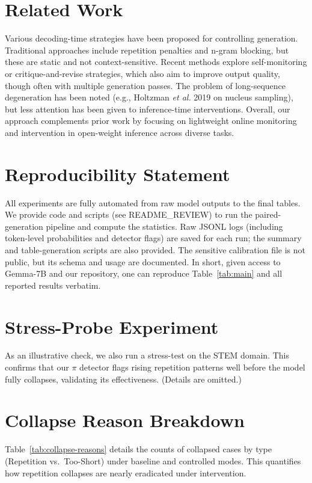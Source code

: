 \documentclass{article}
\begin{document}
\section{Related Work}
Various decoding-time strategies have been proposed for controlling generation. Traditional approaches include repetition penalties and n-gram blocking, but these are static and not context-sensitive. Recent methods explore self-monitoring or critique-and-revise strategies, which also aim to improve output quality, though often with multiple generation passes. The problem of long-sequence degeneration has been noted (e.g., Holtzman \textit{et al.} 2019 on nucleus sampling), but less attention has been given to inference-time interventions. Overall, our approach complements prior work by focusing on lightweight online monitoring and intervention in open-weight inference across diverse tasks.

\section{Reproducibility Statement}
All experiments are fully automated from raw model outputs to the final tables. We provide code and scripts (see README\_REVIEW) to run the paired-generation pipeline and compute the statistics. Raw JSONL logs (including token-level probabilities and detector flags) are saved for each run; the summary and table-generation scripts are also provided. The sensitive calibration file is not public, but its schema and usage are documented. In short, given access to Gemma-7B and our repository, one can reproduce Table~\ref{tab:main} and all reported results verbatim.

\appendix

\section{Stress-Probe Experiment}
As an illustrative check, we also run a stress-test on the STEM domain. This confirms that our $\pi$ detector flags rising repetition patterns well before the model fully collapses, validating its effectiveness. (Details are omitted.)

\section{Collapse Reason Breakdown}
\label{app:reasons}
Table~\ref{tab:collapse-reasons} details the counts of collapsed cases by type (Repetition vs.\ Too-Short) under baseline and controlled modes. This quantifies how repetition collapses are nearly eradicated under intervention.
\end{document}
